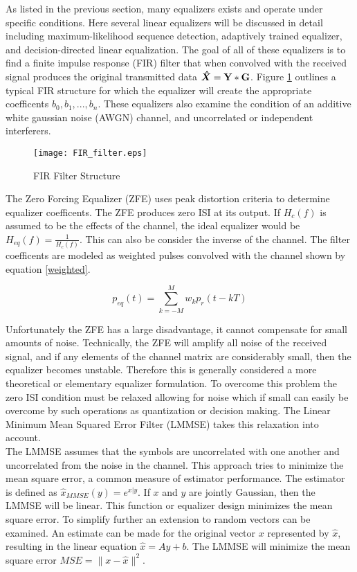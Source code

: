 As listed in the previous section, many equalizers exists and operate under specific conditions.  Here several linear equalizers will be discussed in detail including maximum-likelihood sequence detection, adaptively trained equalizer, and decision-directed linear equalization.  The goal of all of these equalizers is to find a finite impulse response (FIR) filter that when convolved with the received signal produces the original transmitted data \( \boldsymbol{\hat{X}}=\bf{Y} * \bf{G} \).  Figure \ref{FIR_filter} outlines a typical FIR structure for which the equalizer will create the appropriate coefficents \(b_{0},b_{1},..., b_{n} \).  These equalizers also examine the condition of an additive white gaussian noise (AWGN) channel, and uncorrelated or independent interferers.\\

\begin{figure}[!ht]\label{FIR_filter}
\centering
\texttt{[image: FIR\_filter.eps]}
\caption{FIR Filter Structure}
\end{figure}

The Zero Forcing Equalizer (ZFE) uses peak distortion criteria to determine equalizer coefficents.  The ZFE produces zero ISI at its output.  If \(H_{c}(f)\) is assumed to be the effects of the channel, the ideal equalizer would be \( H_{eq}(f)=\frac{1}{H_{c}(f)}\).  This can also be consider the inverse of the channel.  The filter coefficents are modeled as weighted pulses convolved with the channel shown by equation \eqref{weighted}.

\begin{equation}\label{weighted}
p_{eq}(t) = \displaystyle\sum_{k=-M}^{M} w_{k}p_{r}(t-kT)
\end{equation}

Unfortunately the ZFE has a large disadvantage, it cannot compensate for small amounts of noise.  Technically, the ZFE will amplify all noise of the received signal, and if any elements of the channel matrix are considerably small, then the equalizer becomes unstable. Therefore this is generally considered a more theoretical or elementary equalizer formulation.  To overcome this problem the zero ISI condition must be relaxed allowing for noise which if small can easily be overcome by such operations as quantization or decision making.  The Linear Minimum Mean Squared Error Filter (LMMSE) takes this relaxation into account.\\ 

The LMMSE assumes that the symbols are uncorrelated with one another and uncorrelated from the noise in the channel.  This approach tries to minimize the mean square error, a common measure of estimator performance.  The estimator is defined as \(\hat{x}_{MMSE}(y)=e^{x|y}\).  If \(x\) and \(y\) are jointly Gaussian, then the LMMSE will be linear.  This function or equalizer design minimizes the mean square error.  To simplify further an extension to random vectors can be examined.  An estimate can be made for the original vector \(x\) represented by \(\hat{x}\), resulting in the linear equation \(\hat{x}=Ay+b\).  The LMMSE will minimize the mean square error \(MSE = \|x-\hat{x}\|^{2}\).\\

